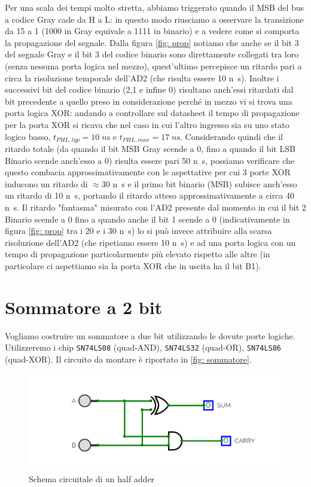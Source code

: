 \documentclass[10pt, a4paper, italian]{article}
\begin{document}
Per una scala dei tempi molto stretta, abbiamo triggerato quando il MSB del bus a codice Gray cade da H a L: in questo modo riusciamo a osservare la transizione da 15 a 1 (1000 in Gray equivale a 1111 in binario) e a vedere come si comporta la propagazione del segnale.
Dalla figura \cref{fig: prop} notiamo che anche se il bit 3 del segnale Gray e il bit 3 del codice binario sono direttamente collegati tra loro (senza nessuna porta logica nel mezzo), quest'ultimo percepisce un ritardo pari a circa la risoluzione temporale dell'AD2 (che risulta essere 10 \si{n\s}).
Inoltre i successivi bit del codice binario (2,1 e infine 0) risultano anch'essi ritardati dal bit precedente a quello preso in considerazione perché in mezzo vi si trova una porta logica XOR: andando a controllare sul datasheet il tempo di propagazione per la porta XOR si ricava che nel caso in cui l'altro ingresso sia su uno stato logico basso, $t_{PHL,typ}=10 \; \si{n\s}$ e $t_{PHL,max}=17 \; \si{n\s}$.
Considerando quindi che il ritardo totale (da quando il bit MSB Gray scende a 0, fino a quando il bit LSB Binario scende anch'esso a 0) risulta essere pari 50 \si{n\s}, possiamo verificare che questo combacia approssimativamente con le aspettative per cui 3 porte XOR inducono un ritardo di $\approx 30$ \si{n\s} e il primo bit binario (MSB) subisce anch'esso un ritardo di 10 \si{n\s}, portando il ritardo atteso approssimativamente a circa 40 \si{n\s}.
Il ritardo "fantasma" misurato con l'AD2 presente dal momento in cui il bit 2 Binario scende a 0 fino a quando anche il bit 1 scende a 0 (indicativamente in figura \cref{fig: prop} tra i 20 e i 30 \si{n\s}) lo si può invece attribuire alla scarsa risoluzione dell'AD2  (che ripetiamo essere 10 \si{n\s}) e ad una porta logica con un tempo di propagazione particolarmente più elevato rispetto alle altre (in particolare ci aspettiamo sia la porta XOR che in uscita ha il bit B1).

\section{Sommatore a 2 bit}
Vogliamo costruire un sommatore a due bit utilizzando le dovute porte logiche. Utilizzeremo i chip \texttt{SN74LS08} (quad-AND), \texttt{SN74LS32} (quad-OR), \texttt{SN74LS86} (quad-XOR). Il circuito da montare è riportato in \cref{fig: sommatore}.

\begin{figure}[htbp]
    \centering
    \includegraphics[width=0.6\linewidth]{half.png}
    \caption{Schema circuitale di un half adder}
    \label{fig:halfadder}
\end{figure}
\end{document}
